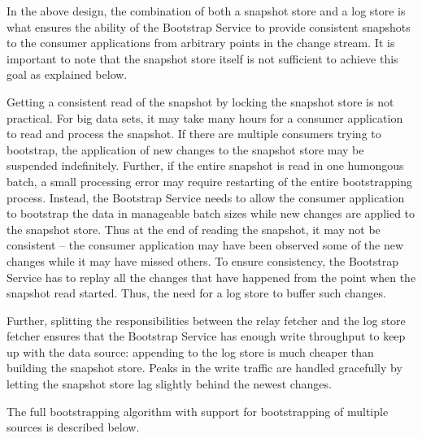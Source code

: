
In the above design, the combination of both a snapshot store and a log store is what ensures the ability of the Bootstrap Service to provide consistent snapshots to the consumer applications from arbitrary points in the change stream. It is important to note that the snapshot store itself is not sufficient to achieve this goal as explained below.

Getting a consistent read of the snapshot by locking the snapshot store is not practical. For big data sets, it may take many hours for a consumer application to read and process the snapshot. If there are multiple consumers trying to bootstrap, the application of new changes to the snapshot store may be suspended indefinitely. Further, if the entire snapshot is read in one humongous batch, a small processing error may require restarting of the entire bootstrapping process. Instead, the Bootstrap Service needs to allow the consumer application to bootstrap the data in manageable batch sizes while new changes are applied to the snapshot store. Thus at the end of reading the snapshot, it may not be consistent -- the consumer application may have been observed some of the new changes while it may have missed others. To ensure consistency, the Bootstrap Service has to replay all the changes that have happened from the point when the snapshot read started. Thus, the need for a log store to buffer such changes.

Further, splitting the responsibilities between the relay fetcher and the log store fetcher ensures that the Bootstrap Service has enough write throughput to keep up with the data source: appending to the log store is much cheaper than building the snapshot store. Peaks in the write traffic are handled gracefully by letting the snapshot store lag slightly behind the newest changes.

The full bootstrapping algorithm with support for bootstrapping of multiple sources is described below.

